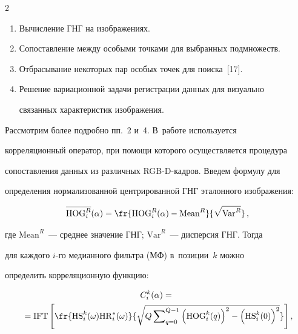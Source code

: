 \begin{multicols}{2}
  \begin{enumerate}[1.]

  \item  Вычисление ГНГ на изображениях.

  \item  Сопоставление между особыми точками для выбранных подмножеств.

  \item  Отбрасывание некоторых пар особых точек для поиска~[17].

  \item Решение вариационной задачи регистрации данных для визуально 

связанных характеристик изображения.

  \end{enumerate}

  

  Рассмотрим более подробно пп.~2 и~4. В~работе используется 

корреляционный оператор, при помощи которого осуществляется процедура 

со\-по\-став\-ле\-ния данных из различных RGB-D-кад\-ров. Введем формулу для 

определения нормализованной центрированной ГНГ эталонного изображения:

  \begin{equation*}

  \overline{\mathrm{HOG}_i^R}(\alpha) =\fr{\mathrm{HOG}_i^R(\alpha) -

  \mathrm{Mean}^R}{\sqrt{\mathrm{Var}^R}}\,,


  \end{equation*}

где $\mathrm{Mean}^R$~--- среднее значение ГНГ; $\mathrm{Var}^R$~--- дисперсия ГНГ. Тогда 

для каж\-до\-го $i$-го медианного фильт\-ра (МФ) в~позиции~$k$ можно 

определить корреляционную функцию:

\begin{multline*}

C_i^k(\alpha) ={}\\

{}=\mathrm{IFT} \left[ \fr{\mathrm{HS}_i^k(\omega) \mathrm{HR}_i^*(\omega)} {\sqrt{Q 

\sum\nolimits_{q=0}^{Q-1}\left( \mathrm{HOG}_i^k(q)\right)^2- \left( 

\mathrm{HS}_i^k(0)\right)^2}}\right],\hspace*{-0.56015pt}


\end{multline*}
\end{multicols}
